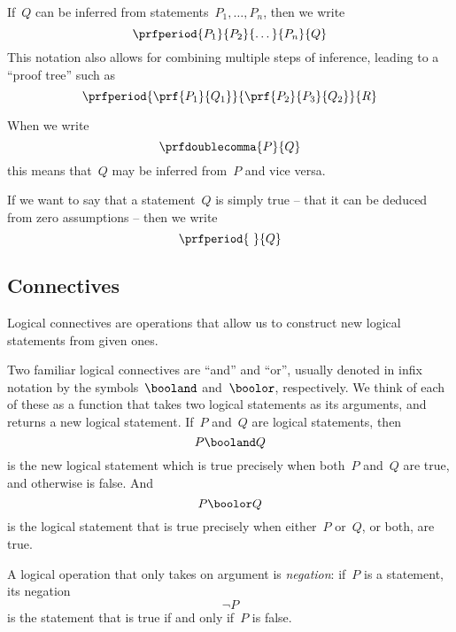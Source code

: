If~$Q$ can be inferred from statements~$P_1, \ldots, P_n$, then we write
\begin{equation}
    \prfperiod{
        P_1
    }{
        P_2
    }{
        \dots
    }{
        P_n
    }{
        Q
    }
\end{equation}
This notation also allows for combining multiple steps of inference, leading to a ``proof tree'' such as
\begin{equation}
    \prfperiod{
        \prf{
            P_1
        }{
            Q_1
        }
    }{
        \prf{
            P_2
        }{
            P_3
        }{
            Q_2
        }
    }{
        R
    }
\end{equation}

When we write
\begin{equation}
    \prfdoublecomma{
        P
    }{
        Q
    }
\end{equation}
this means that~$Q$ may be inferred from~$P$ and vice versa.

If we want to say that a statement~$Q$ is simply true -- that it can be deduced from zero assumptions -- then we write
\begin{equation}
    \prfperiod{
        \
    }{
        Q
    }
\end{equation}

\subsection{Connectives}
\label{seq:booland}
\label{seq:boolor}
Logical connectives are operations that allow us to construct new logical statements from given ones.

Two familiar logical connectives are ``and'' and ``or'', usually denoted in infix notation by the symbols~$\booland$ and~$\boolor$, respectively.
We think of each of these as a function that takes two logical statements as its arguments, and returns a new logical statement.
If~$P$ and~$Q$ are logical statements, then
%
\begin{equation}
    P \booland Q
\end{equation}
%
is the new logical statement which is true precisely when both~$P$ and~$Q$ are true, and otherwise is false.
And
\begin{equation}
    P \boolor Q
\end{equation}
is the logical statement that is true precisely when either~$P$ or~$Q$, or both, are true.

A logical operation that only takes on argument is \emph{negation}: if~$P$ is a statement, its negation
\begin{equation}
    \lnot P
\end{equation}
is the statement that is true if and only if~$P$ is false.

